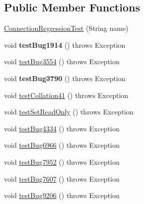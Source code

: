 \subsection*{Public Member Functions}
\begin{DoxyCompactItemize}
\item 
\mbox{\hyperlink{classtestsuite_1_1regression_1_1_connection_regression_test_aafc0f9ce5c17349773526cb4dc1d0cd7}{Connection\+Regression\+Test}} (String name)
\item 
\mbox{\label{classtestsuite_1_1regression_1_1_connection_regression_test_a4e3b703a4128c3a6aef0462052f61225}} 
void {\bfseries test\+Bug1914} ()  throws Exception 
\item 
void \mbox{\hyperlink{classtestsuite_1_1regression_1_1_connection_regression_test_a37a5b68fc2ee7b632c08744bc7579f29}{test\+Bug3554}} ()  throws Exception 
\item 
\mbox{\label{classtestsuite_1_1regression_1_1_connection_regression_test_a54ef158c3ee3231b4628a9509b299642}} 
void {\bfseries test\+Bug3790} ()  throws Exception 
\item 
void \mbox{\hyperlink{classtestsuite_1_1regression_1_1_connection_regression_test_a8bca083f14a9aedf92ba2d80fd44a71f}{test\+Collation41}} ()  throws Exception 
\item 
void \mbox{\hyperlink{classtestsuite_1_1regression_1_1_connection_regression_test_ae79808e3889aec702379cc6fe4163e22}{test\+Set\+Read\+Only}} ()  throws Exception 
\item 
void \mbox{\hyperlink{classtestsuite_1_1regression_1_1_connection_regression_test_a83abae1bb52b0bab9efe6949e40faecf}{test\+Bug4334}} ()  throws Exception 
\item 
void \mbox{\hyperlink{classtestsuite_1_1regression_1_1_connection_regression_test_ad40619b88e8c45d0c604f376a8d0fd91}{test\+Bug6966}} ()  throws Exception 
\item 
void \mbox{\hyperlink{classtestsuite_1_1regression_1_1_connection_regression_test_a678832d70128500168a8e75e47930a55}{test\+Bug7952}} ()  throws Exception 
\item 
void \mbox{\hyperlink{classtestsuite_1_1regression_1_1_connection_regression_test_a546e675781e810a5d2ba2f12d41a3f24}{test\+Bug7607}} ()  throws Exception 
\item 
void \mbox{\hyperlink{classtestsuite_1_1regression_1_1_connection_regression_test_a296d1449fdc8a1628b7029ab70e450e8}{test\+Bug9206}} ()  throws Exception 

\end{DoxyCompactItemize}
